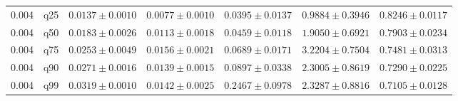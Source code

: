 \begin{table}[t]
\begin{tabular}{llccccc}
0.004 & q25 & $0.0137 \pm 0.0010$ & $0.0077 \pm 0.0010$ & $0.0395 \pm 0.0137$ & $0.9884 \pm 0.3946$ & $0.8246 \pm 0.0117$ \\
0.004 & q50 & $0.0183 \pm 0.0026$ & $0.0113 \pm 0.0018$ & $0.0459 \pm 0.0118$ & $1.9050 \pm 0.6921$ & $0.7903 \pm 0.0234$ \\
0.004 & q75 & $0.0253 \pm 0.0049$ & $0.0156 \pm 0.0021$ & $0.0689 \pm 0.0171$ & $3.2204 \pm 0.7504$ & $0.7481 \pm 0.0313$ \\
0.004 & q90 & $0.0271 \pm 0.0016$ & $0.0139 \pm 0.0015$ & $0.0897 \pm 0.0338$ & $2.3005 \pm 0.8619$ & $0.7290 \pm 0.0225$ \\
0.004 & q99 & $0.0319 \pm 0.0010$ & $0.0142 \pm 0.0025$ & $0.2467 \pm 0.0978$ & $2.3287 \pm 0.8816$ & $0.7105 \pm 0.0128$ \\
\bottomrule
\end{tabular}
\end{table}
